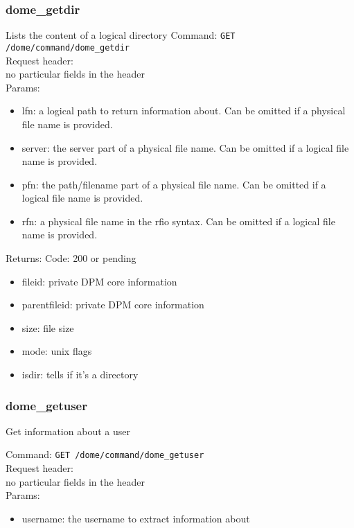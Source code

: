 \documentclass[a4paper,10pt]{scrreprt}
\begin{document}
\subsubsection{dome\_getdir}

Lists the content of a logical directory
Command:
\lstinline"GET /dome/command/dome_getdir"\\

Request header:\\
no particular fields in the header\\

Params:
\begin{itemize}
 \item lfn: a logical path to return information about. Can be omitted if a physical file name is provided.
 \item server: the server part of a physical file name. Can be omitted if a logical file name is provided.
 \item pfn: the path/filename part of a physical file name. Can be omitted if a logical file name is provided.
 \item rfn: a physical file name in the rfio syntax. Can be omitted if a logical file name is provided.
\end{itemize}

Returns:
Code: 200 or pending
\begin{itemize}
 \item fileid: private DPM core information
 \item parentfileid: private DPM core information
 \item size: file size
 \item mode: unix flags
 \item isdir: tells if it's a directory
\end{itemize}


\subsubsection{dome\_getuser}

Get information about a user

Command:
\lstinline"GET /dome/command/dome_getuser"\\

Request header:\\
no particular fields in the header\\

Params:
\begin{itemize}
 \item username: the username to extract information about
\end{itemize}
\end{document}
